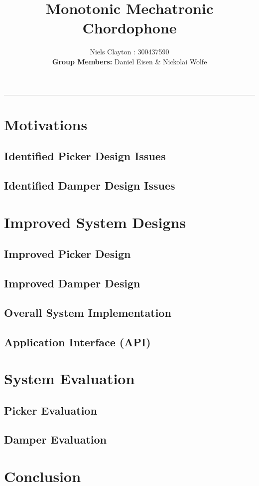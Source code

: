 \documentclass[a4paper,11pt]{article}
\begin{document}
\title{\LARGE{\textbf{Monotonic Mechatronic Chordophone}}}
\author{Niels Clayton : 300437590\\\textbf{Group Members:} Daniel Eisen \& Nickolai Wolfe}
\date{}
\maketitle
\hrule

\section{Motivations}

\subsection{Identified Picker Design Issues}

\subsection{Identified Damper Design Issues}


\section{Improved System Designs}

\subsection{Improved Picker Design}

\subsection{Improved Damper Design}

\subsection{Overall System Implementation}

\subsection{Application Interface (API)}

\section{System Evaluation}

\subsection{Picker Evaluation}

\subsection{Damper Evaluation}

\section{Conclusion}
\end{document}
